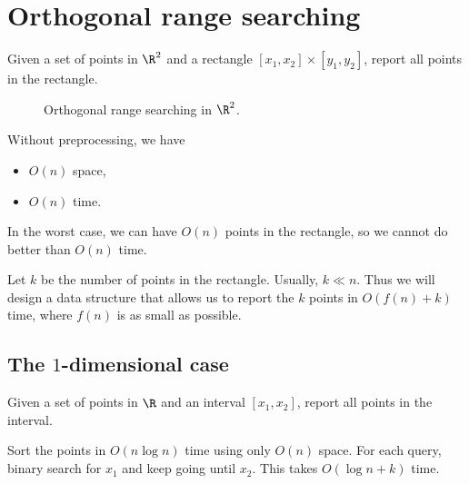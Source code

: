 \chapter{Orthogonal range searching} \label{chp:ors}

\begin{question*}
    Given a set of points in $\R^2$ and a rectangle
    $[x_1, x_2] \times [y_1, y_2]$, report all points in the rectangle.
\end{question*}

\begin{figure}
    \centering
    \caption{Orthogonal range searching in $\R^2$.}
    \label{fig:ors}
\end{figure}

Without preprocessing, we have
\begin{itemize}
    \item $O(n)$ space,
    \item $O(n)$ time.
\end{itemize}

In the worst case, we can have $O(n)$ points in the rectangle,
so we cannot do better than $O(n)$ time.

Let $k$ be the number of points in the rectangle.
Usually, $k \ll n$.
Thus we will design a data structure that allows us to report
the $k$ points in $O(f(n) + k)$ time, where $f(n)$ is as small as possible.

\section{The $1$-dimensional case} \label{sec:ors:1d}
\begin{question*}
    Given a set of points in $\R$ and an interval $[x_1, x_2]$,
    report all points in the interval.
\end{question*}
\begin{solution}
    Sort the points in $O(n \log n)$ time using only $O(n)$ space.
    For each query, binary search for $x_1$ and keep going until $x_2$.
    This takes $O(\log n + k)$ time.
\end{solution}

